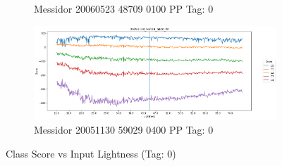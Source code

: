 \begin{figure}[ht!]
\begin{subfigure}[b]{ 0.85\textwidth}
		\caption{Messidor 20060523 48709 0100 PP Tag: 0}		
	\end{subfigure}
	\begin{subfigure}[b]{ 0.85\textwidth}
		\centering
		\includegraphics[width=\textwidth]{Figures/chapter_stability/20051130_59029_0400_PP/l/scores.png}
		\caption{Messidor 20051130 59029 0400 PP Tag: 0}		
	\end{subfigure}
	\hfill 
	\caption[Score vs Lightness (Tag: 0)]{Class Score vs Input Lightness (Tag: 0)}  
	\label{sta:fig:lig0} 
\end{figure}

